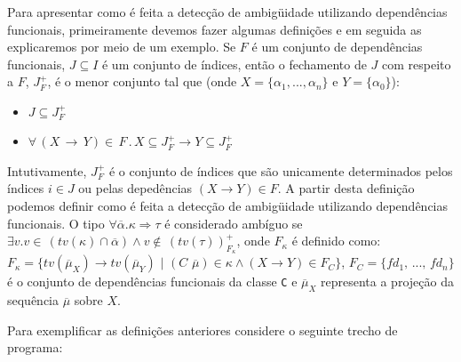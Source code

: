 Para apresentar como \'e feita a detec\c{c}\~ao de ambig\"uidade utilizando depend\^encias funcionais, primeiramente
devemos fazer algumas defini\c{c}\~oes e em seguida as explicaremos por meio de um exemplo. 
Se $F$ \'e um conjunto de depend\^encias funcionais, $J\subseteq I$ \'e um
conjunto de \'indices, ent\~ao o fechamento de $J$ com respeito a $F$, $J^{+}_{F}$, \'e o menor conjunto tal que 
(onde $X=\{\alpha_{1},...,\alpha_{n}\}$ e $Y=\{\alpha_{0}\}$):
\begin{itemize}
	\item $J\subseteq J^{+}_{F}$
	\item $\forall\,(X\,\rightarrow\,Y)\in\, F\,.\, X\subseteq J^{+}_{F}\rightarrow Y\subseteq J^{+}_{F}$
\end{itemize}
Intutivamente, $J^{+}_{F}$ \'e o conjunto de \'indices que s\~ao unicamente determinados pelos \'indices $i\in J$ ou 
pelas deped\^encias $(X\rightarrow Y)\in F$. 
A partir desta defini\c{c}\~ao podemos definir como \'e feita a 
detec\c{c}\~ao de ambig\"uidade utilizando depend\^encias funcionais. O tipo 
$\forall\overline{\alpha}.\kappa\Rightarrow\tau$ \'e considerado amb\'iguo se
$\exists v.v\in\,(tv(\kappa)\cap\overline{\alpha})\land v\not\in\, (tv(\tau))^{+}_{F_{\kappa}}$, onde $F_{\kappa}$ \'e
definido como: 
$F_{\kappa}=\{tv(\overline{\mu}_{X})\rightarrow tv(\overline{\mu}_{Y})\,\, |\,\,(C\,\, \overline{\mu}) 
				\in \kappa \land (X\rightarrow Y) \in F_{C}\}$, $F_{C}=\{fd_{1},\,...,\,fd_{n}\}$ \'e o conjunto
de depend\^encias funcionais da classe \texttt{C}
e $\overline{\mu}_{X}$ representa a proje\c{c}\~ao da sequ\^encia $\overline{\mu}$ sobre $X$.

Para exemplificar as defini\c{c}\~oes anteriores considere o seguinte trecho de programa: 

